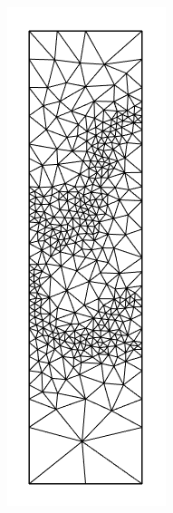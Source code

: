 \documentclass{article}
\begin{document}
\begin{figure}[H]
\begin{subfigure}[b]{0.1\linewidth}
    \caption{}
  \end{subfigure}
  \begin{subfigure}[b]{0.1\linewidth}
    \includegraphics[width=\linewidth]{Fig_submesh2.png}

\end{subfigure}
\end{figure}
\end{document}
